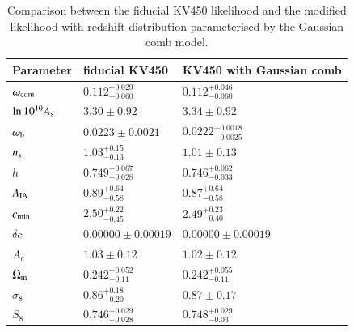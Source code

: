 \documentclass{aa}
\begin{document}
\begin{appendix}
\begin{table}
\caption{Comparison between the fiducial KV450 likelihood and the modified likelihood with redshift distribution parameterised by the Gaussian comb model.}
\begin{tabular}{lll}
\hline
\hline
Parameter & fiducial KV450 & KV450 with Gaussian comb\\
\hline
$\omega_{\rm cdm }  $ & $0.112^{+0.029}_{-0.060}   $& $0.112^{+0.046}_{-0.060}   $\\

$\ln10^{10}A_{\rm s}$ & $3.30\pm 0.92              $& $3.34\pm 0.92              $\\

$\omega_{\rm b}    $ & $0.0223\pm 0.0021          $& $0.0222^{+0.0018}_{-0.0025}$\\

$n_{\rm s}         $ & $1.03^{+0.15}_{-0.13}      $& $1.01\pm 0.13              $\\

$h              $ & $0.749^{+0.067}_{-0.028}   $& $0.746^{+0.062}_{-0.033}   $\\
\hline
$A_{\rm IA}        $ & $0.89^{+0.64}_{-0.58}      $& $0.87^{+0.64}_{-0.58}              $\\

$c_{\rm min}       $ & $2.50^{+0.22}_{-0.45}      $& $2.49^{+0.23}_{-0.40}     $\\

$\delta c             $ & $0.00000\pm 0.00019        $& $0.00000\pm 0.00019        $\\

$A_c             $ & $1.03\pm 0.12              $& $1.02\pm 0.12              $\\

$\Omega_{\rm m}    $ & $0.242^{+0.052}_{-0.11}    $& $0.242^{+0.055}_{-0.11}    $\\

$\sigma_8        $ & $0.86^{+0.18}_{-0.20}      $& $0.87\pm 0.17      $\\
$S_8$		& $0.746_{-0.028}^{+0.029}$&$0.748_{-0.03}^{+0.029}$\\
\hline
\end{tabular}
\label{tab:consistency}
\end{table}


\end{appendix}
\end{document}

